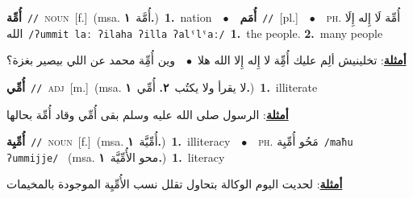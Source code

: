 \documentclass[10pt,a4paper,twoside]{article} %
\begin{document}
\begin{multicols}{2}
{\setlength\topsep{0pt}\textbf{\foreignlanguage{arabic}{أُمِّة}}\ {\color{gray}\texttt{//}\color{black}}\ \textsc{noun}\ [f.]\ \color{gray}(msa. \foreignlanguage{arabic}{أُمَّة}~\foreignlanguage{arabic}{\textbf{١.}})\color{black}\ \textbf{1.}~nation\ \ $\bullet$\ \ \setlength\topsep{0pt}\textbf{\foreignlanguage{arabic}{أُمَم}}\ {\color{gray}\texttt{//}\color{black}}\ [pl.]\ \ $\bullet$\ \ \textsc{ph.} \color{gray} \foreignlanguage{arabic}{أُمِّة لَا إِله إِلَا الله}\color{black}\ {\color{gray}\texttt{/{\sffamily ʔummit laː ʔilaha ʔilla ʔalˤlˤaː}/}\color{black}}\ \textbf{1.}~the people.  \textbf{2.}~many people\  \begin{flushright}\color{gray}\foreignlanguage{arabic}{\textbf{\underline{\foreignlanguage{arabic}{أمثلة}}}: تخلينيش ألِم عليك أُمِِّة لا إِله إِلا الله هلا\ $\bullet$\ \  وين أُمِِّة محمد عن اللي بيصير بغزة؟}\end{flushright}\color{black}} \vspace{2mm}

{\setlength\topsep{0pt}\textbf{\foreignlanguage{arabic}{أُمِّي}}\ {\color{gray}\texttt{//}\color{black}}\ \textsc{adj}\ [m.]\ \color{gray}(msa. \foreignlanguage{arabic}{لا يقرأ ولا يكتُب}~\foreignlanguage{arabic}{\textbf{٢.}}  \foreignlanguage{arabic}{أُمِّي}~\foreignlanguage{arabic}{\textbf{١.}})\color{black}\ \textbf{1.}~illiterate\  \begin{flushright}\color{gray}\foreignlanguage{arabic}{\textbf{\underline{\foreignlanguage{arabic}{أمثلة}}}: الرسول صلى الله عليه وسلم بقى أُمِّي وقاد أُمِّة بحالها}\end{flushright}\color{black}} \vspace{2mm}

{\setlength\topsep{0pt}\textbf{\foreignlanguage{arabic}{أُمِّيِة}}\ {\color{gray}\texttt{//}\color{black}}\ \textsc{noun}\ [f.]\ \color{gray}(msa. \foreignlanguage{arabic}{أُمِّيَّة}~\foreignlanguage{arabic}{\textbf{١.}})\color{black}\ \textbf{1.}~illiteracy\ \ $\bullet$\ \ \textsc{ph.} \color{gray} \foreignlanguage{arabic}{مَحُو أُمِّيِة}\color{black}\ {\color{gray}\texttt{/{\sffamily maħu ʔummijje}/}\color{black}}\ \color{gray} (msa. \foreignlanguage{arabic}{محو الأُمِّيَّة}~\foreignlanguage{arabic}{\textbf{١.}})\color{black}\ \textbf{1.}~literacy\  \begin{flushright}\color{gray}\foreignlanguage{arabic}{\textbf{\underline{\foreignlanguage{arabic}{أمثلة}}}: لحديت اليوم الوكالة بتحاول تقلل نسب الأُمِّيِة الموجودة بالمخيمات}\end{flushright}\color{black}} \vspace{2mm}


\end{multicols}
\end{document}
